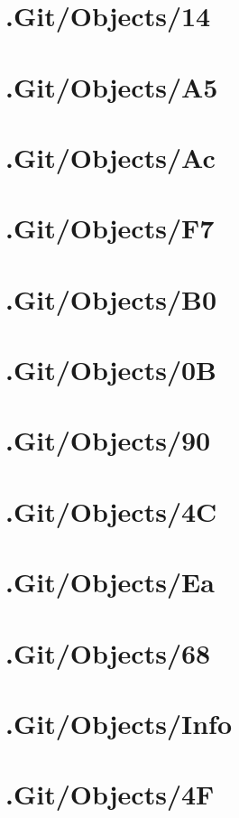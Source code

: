 \section*{.Git/Objects/14}

\section*{.Git/Objects/A5}

\section*{.Git/Objects/Ac}

\section*{.Git/Objects/F7}

\section*{.Git/Objects/B0}

\section*{.Git/Objects/0B}

\section*{.Git/Objects/90}

\section*{.Git/Objects/4C}

\section*{.Git/Objects/Ea}

\section*{.Git/Objects/68}

\section*{.Git/Objects/Info}

\section*{.Git/Objects/4F}

